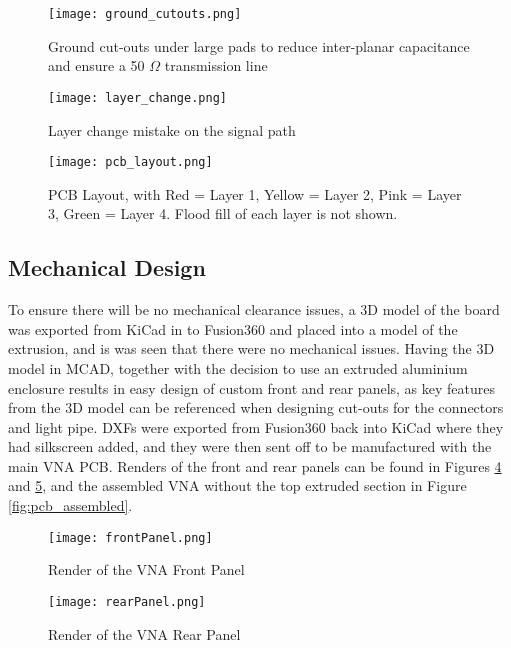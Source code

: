 \begin{figure}[H]
	\centering
	\texttt{[image: ground\_cutouts.png]}
	\caption{Ground cut-outs under large pads to reduce inter-planar capacitance and ensure a 50 $\Omega$ transmission line}
	\label{fig:pcb_cap_comp}
\end{figure}

\begin{figure}[H]
	\centering
	\texttt{[image: layer\_change.png]}
	\caption{Layer change mistake on the signal path}
	\label{fig:pcb_layer_change}
\end{figure}

\begin{landscape}
	\begin{figure}
		\centering
		\texttt{[image: pcb\_layout.png]}
		\caption{PCB Layout, with Red = Layer 1, Yellow = Layer 2, Pink = Layer 3, Green = Layer 4. Flood fill of each layer is not shown.}
		\label{fig:pcb_layout}
	\end{figure}
\end{landscape}

\subsection{Mechanical Design}
To ensure there will be no mechanical clearance issues, a 3D model of the board was exported from KiCad in to Fusion360 and placed into a model of the extrusion, and is was seen that there were no mechanical issues. Having the 3D model in MCAD, together with the decision to use an extruded aluminium enclosure results in easy design of custom front and rear panels, as key features from the 3D model can be referenced when designing cut-outs for the connectors and light pipe. DXFs were exported from Fusion360 back into KiCad where they had silkscreen added, and they were then sent off to be manufactured with the main VNA PCB. Renders of the front and rear panels can be found in Figures \ref{fig:pcb_front_render} and \ref{fig:pcb_rear_render}, and the assembled VNA without the top extruded section in Figure \ref{fig:pcb_assembled}.

\begin{figure}[H]
	\centering
	\texttt{[image: frontPanel.png]}
	\caption{Render of the VNA Front Panel}
	\label{fig:pcb_front_render}
\end{figure}

\begin{figure}[H]
	\centering
	\texttt{[image: rearPanel.png]}
	\caption{Render of the VNA Rear Panel}
	\label{fig:pcb_rear_render}
\end{figure}

